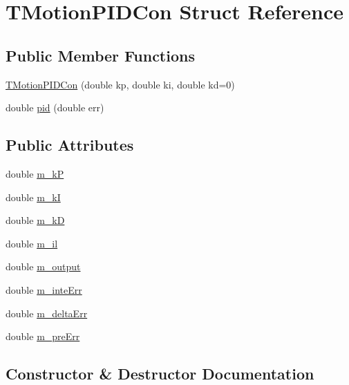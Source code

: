 \hypertarget{structTMotionPIDCon}{}\section{T\+Motion\+P\+I\+D\+Con Struct Reference}
\label{structTMotionPIDCon}
\subsection*{Public Member Functions}
\begin{DoxyCompactItemize}
\item 
\mbox{\hyperlink{structTMotionPIDCon_a89a9b1ec1b91eb7ea5b3dd9f3dd38d92}{T\+Motion\+P\+I\+D\+Con}} (double kp, double ki, double kd=0)
\item 
double \mbox{\hyperlink{structTMotionPIDCon_a138ff107e0fece2fd74a1fed606261ae}{pid}} (double err)
\end{DoxyCompactItemize}
\subsection*{Public Attributes}
\begin{DoxyCompactItemize}
\item 
double \mbox{\hyperlink{structTMotionPIDCon_ac8a816dbcf1f644c140dbd2f7b8df58d}{m\+\_\+kP}}
\item 
double \mbox{\hyperlink{structTMotionPIDCon_ac8192a3af9ef9f350128f34c276ce493}{m\+\_\+kI}}
\item 
double \mbox{\hyperlink{structTMotionPIDCon_a07e1da9c56d8153c6c576bb8b533a80d}{m\+\_\+kD}}
\item 
double \mbox{\hyperlink{structTMotionPIDCon_ac048b1ed8486f28e941648bc0518695a}{m\+\_\+il}}
\item 
double \mbox{\hyperlink{structTMotionPIDCon_a51de95c7d07b1bf075d5e5834671506a}{m\+\_\+output}}
\item 
double \mbox{\hyperlink{structTMotionPIDCon_ad7b4b7d9804f5130511442b8f1543d09}{m\+\_\+inte\+Err}}
\item 
double \mbox{\hyperlink{structTMotionPIDCon_a70da1dcf5bae866184f047980ef4eae2}{m\+\_\+delta\+Err}}
\item 
double \mbox{\hyperlink{structTMotionPIDCon_a319c2f863bb3965d8caaa008e2e1bd87}{m\+\_\+pre\+Err}}
\end{DoxyCompactItemize}


\subsection{Constructor \& Destructor Documentation}
\mbox{\label{structTMotionPIDCon_a89a9b1ec1b91eb7ea5b3dd9f3dd38d92}} 
